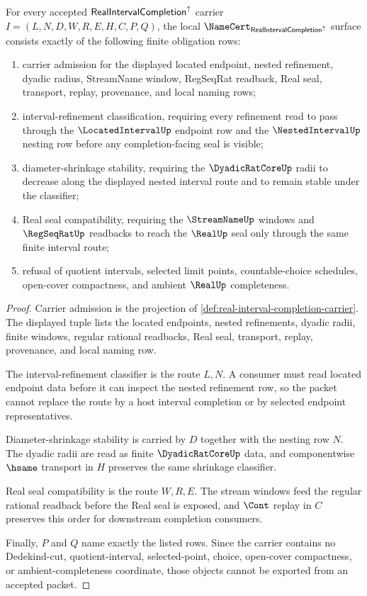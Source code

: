 \begin{theorem}
\label{thm:real-interval-completion-namecert-obligations}
For every accepted $\mathsf{RealIntervalCompletion}^{\uparrow}$ carrier $I=(L,N,D,W,R,E,H,C,P,Q)$, the local $\NameCert_{\RealIntervalCompletionUp}$ surface consists exactly of the following finite obligation rows:
\begin{enumerate}
\item carrier admission for the displayed located endpoint, nested refinement, dyadic radius, StreamName window, RegSeqRat readback, Real seal, transport, replay, provenance, and local naming rows;
\item interval-refinement classification, requiring every refinement read to pass through the $\LocatedIntervalUp$ endpoint row and the $\NestedIntervalUp$ nesting row before any completion-facing seal is visible;
\item diameter-shrinkage stability, requiring the $\DyadicRatCoreUp$ radii to decrease along the displayed nested interval route and to remain stable under the classifier;
\item Real seal compatibility, requiring the $\StreamNameUp$ windows and $\RegSeqRatUp$ readbacks to reach the $\RealUp$ seal only through the same finite interval route;
\item refusal of quotient intervals, selected limit points, countable-choice schedules, open-cover compactness, and ambient $\RealUp$ completeness.
\end{enumerate}
\end{theorem}
\begin{proof}
Carrier admission is the projection of \autoref{def:real-interval-completion-carrier}. The displayed tuple lists the located endpoints, nested refinements, dyadic radii, finite windows, regular rational readbacks, Real seal, transport, replay, provenance, and local naming row.

The interval-refinement classifier is the route $L,N$. A consumer must read located endpoint data before it can inspect the nested refinement row, so the packet cannot replace the route by a host interval completion or by selected endpoint representatives.

Diameter-shrinkage stability is carried by $D$ together with the nesting row $N$. The dyadic radii are read as finite $\DyadicRatCoreUp$ data, and componentwise $\hsame$ transport in $H$ preserves the same shrinkage classifier.

Real seal compatibility is the route $W,R,E$. The stream windows feed the regular rational readback before the Real seal is exposed, and $\Cont$ replay in $C$ preserves this order for downstream completion consumers.

Finally, $P$ and $Q$ name exactly the listed rows. Since the carrier contains no Dedekind-cut, quotient-interval, selected-point, choice, open-cover compactness, or ambient-completeness coordinate, those objects cannot be exported from an accepted packet.
\end{proof}

